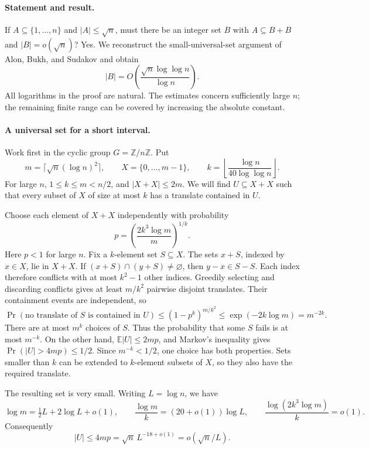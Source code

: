 \paragraph{Statement and result.}
If \(A\subseteq\{1,\ldots,n\}\) and \(|A|\leq\sqrt n\), must there be an integer set \(B\) with \(A\subseteq B+B\) and \(|B|=o(\sqrt n)\)? Yes. We reconstruct the small-universal-set argument of Alon, Bukh, and Sudakov and obtain
\[
 |B|=O\!\left(\frac{\sqrt n\log\log n}{\log n}\right).
\]
All logarithms in the proof are natural. The estimates concern sufficiently large \(n\); the remaining finite range can be covered by increasing the absolute constant.

\paragraph{A universal set for a short interval.}
Work first in the cyclic group \(G=\mathbb Z/n\mathbb Z\). Put
\[
 m=\lceil\sqrt n(\log n)^2\rceil,\qquad
 X=\{0,\ldots,m-1\},\qquad
 k=\left\lfloor\frac{\log n}{40\log\log n}\right\rfloor.
\]
For large \(n\), \(1\leq k\leq m<n/2\), and \(|X+X|\leq2m\). We will find \(U\subseteq X+X\) such that every subset of \(X\) of size at most \(k\) has a translate contained in \(U\).

Choose each element of \(X+X\) independently with probability
\[
 p=\left(\frac{2k^3\log m}{m}\right)^{1/k}.
\]
Here \(p<1\) for large \(n\). Fix a \(k\)-element set \(S\subseteq X\). The sets \(x+S\), indexed by \(x\in X\), lie in \(X+X\). If \((x+S)\cap(y+S)\ne\varnothing\), then \(y-x\in S-S\). Each index therefore conflicts with at most \(k^2-1\) other indices. Greedily selecting and discarding conflicts gives at least \(m/k^2\) pairwise disjoint translates. Their containment events are independent, so
\[
 \Pr(\text{no translate of }S\text{ is contained in }U)
 \leq(1-p^k)^{m/k^2}
 \leq\exp(-2k\log m)=m^{-2k}.
\]
There are at most \(m^k\) choices of \(S\). Thus the probability that some \(S\) fails is at most \(m^{-k}\). On the other hand,
\(\mathbb E|U|\leq2mp\), and Markov's inequality gives
\(\Pr(|U|>4mp)\leq1/2\). Since \(m^{-k}<1/2\), one choice has both properties. Sets smaller than \(k\) can be extended to \(k\)-element subsets of \(X\), so they also have the required translate.

The resulting set is very small. Writing \(L=\log n\), we have
\[
 \log m=\tfrac12L+2\log L+o(1),\qquad
 \frac{\log m}{k}=(20+o(1))\log L,
 \qquad
 \frac{\log(2k^3\log m)}{k}=o(1).
\]
Consequently
\[
 |U|\leq4mp=\sqrt n\,L^{-18+o(1)}
 =o(\sqrt n/L).
\tag{1}
\]

